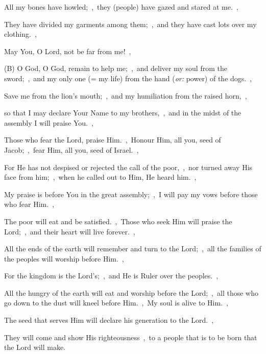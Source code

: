\documentclass[12pt,twoside,a5paper]{article}
\newcommand{\translationoption}[1]{\emph{or:} #1}
\begin{document}
\begin{normalparskip}
  All my bones have howled;~\sep\ they (people) have gazed and stared at me.~\sep

  They have divided my garments among them;~\sep\ and they have cast lots over my clothing.~\sep

  May You, O Lord, not be far from me!~\sep

  (B) O God, O God, remain to help me;~\sep\ and deliver my soul from the sword;~\sep\ and my only one (= my life) from the hand (\translationoption{power}) of the dogs.~\sep

  Save me from the lion's mouth;~\sep\ and my humiliation from the raised horn,~\sep

  so that I may declare Your Name to my brothers,~\sep\ and in the midst of the assembly I will praise You.~\sep

  Those who fear the Lord, praise Him.~\sep\ Honour Him, all you, seed of Jacob;~\sep\ fear Him, all you, seed of Israel.~\sep

  For He has not despised or rejected the call of the poor,~\sep\ nor turned away His face from him;~\sep\ when he called out to Him, He heard him.~\sep

  My praise is before You in the great assembly;~\sep\ I will pay my vows before those who fear Him.~\sep

  The poor will eat and be satisfied.~\sep\ Those who seek Him will praise the Lord;~\sep\ and their heart will live forever.~\sep

  All the ends of the earth will remember and turn to the Lord;~\sep\ all the families of the peoples will worship before Him.~\sep

  For the kingdom is the Lord's;~\sep\ and He is Ruler over the peoples.~\sep

  All the hungry of the earth will eat and worship before the Lord;~\sep\ all those who go down to the dust will kneel before Him.~\sep\ My soul is alive to Him.~\sep

  The seed that serves Him will declare his generation to the Lord.~\sep

  They will come and show His righteousness~\sep\ to a people that is to be born that the Lord will make.
\end{normalparskip}
\end{document}

